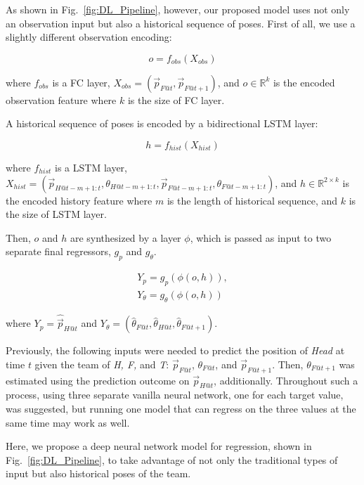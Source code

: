 \documentclass[letterpaper, 10 pt, conference]{ieeeconf}  %
\begin{document}
	As shown in Fig.~\ref{fig:DL_Pipeline}, however, our proposed model uses not only 
	an observation input but also a historical sequence of poses. First of all, we 
	use a slightly different observation encoding: 

	\begin{equation}
	o = f_{obs}(X_{obs})
	\end{equation}

	where $f_{obs}$ is a FC layer,
		$X_{obs} = (\vec{p}_{F@t}, \vec{p}_{F@t+1})$, 
		and $o \in \mathbb{R}^{k}$ is the encoded observation feature 
		where $k$ is the size of FC layer. 
		
	A historical sequence of poses is encoded by a bidirectional LSTM layer: 

	\begin{equation}
	h = f_{hist}(X_{hist})
	\end{equation}


     where $f_{hist}$ is a LSTM layer,	
		$X_{hist} = (\vec{p}_{H@t-m+1:t}, \theta_{H@t-m+1:t},
		             \vec{p}_{F@t-m+1:t}, \theta_{F@t-m+1:t})$,		
		and $h \in \mathbb{R}^{2 \times k}$ is the encoded history feature
	where $m$ is the length of historical sequence, 
	and $k$ is the size of LSTM layer. 

	Then, $o$ and $h$ are synthesized by a layer $\phi$, which is 
	passed as input to two separate final regressors, $g_{p}$ and $g_\theta$.  
	
	\begin{equation}
	\begin{split}
	Y_{p} = g_{p}(\phi(o, h)),\\
	Y_{\theta}= g_{\theta}(\phi(o, h)) 
	\end{split}
	\end{equation}
	
	where 
	$Y_{p} = \hat{\vec{p}}_{H@t}$ and
	$Y_{\theta} = (\hat{\theta}_{F@t}, \hat{\theta}_{H@t}, \hat{\theta}_{F@t+1})$.
	
	
	Previously, the following inputs were needed to 
	predict the position of \emph{Head} at time $t$ given the team of 
	\emph{H, F,} and \emph{T}: $\vec{p}_{F@t}$, $\theta_{F@t}$, and $\vec{p}_{F@t+1}$.
	Then, $\theta_{F@t+1}$ was estimated using the prediction outcome on $\vec{p}_{H@t}$, 
	additionally. Throughout such a process, using three separate vanilla neural network, 
	one for each target value, was suggested, but running one model that can regress on the 
	three values at the same time may work as well.
	
	Here, we propose a deep neural network model for regression, shown 
	in Fig.~\ref{fig:DL_Pipeline}, to take advantage of not only the 
	traditional types of input but also historical poses of the team.
	
\end{document}
